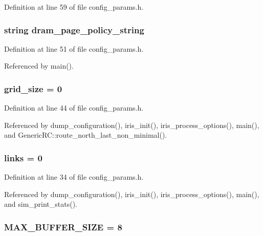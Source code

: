 Definition at line 59 of file config\_\-params.h.
\subsubsection[{dram\_\-page\_\-policy\_\-string}]{\setlength{\rightskip}{0pt plus 5cm}string {\bf dram\_\-page\_\-policy\_\-string}}\label{config__params_8h_11f6161a6a3e7db8577622882e0bd0a1}




Definition at line 51 of file config\_\-params.h.

Referenced by main().
\subsubsection[{grid\_\-size}]{ {\bf grid\_\-size} = 0}\label{config__params_8h_7cdd59c13b3ee2f719faf442120c1411}




Definition at line 44 of file config\_\-params.h.

Referenced by dump\_\-configuration(), iris\_\-init(), iris\_\-process\_\-options(), main(), and GenericRC::route\_\-north\_\-last\_\-non\_\-minimal().
\subsubsection[{links}]{ {\bf links} = 0}\label{config__params_8h_67ab92741d3553f20eba205ad4a0a196}




Definition at line 34 of file config\_\-params.h.

Referenced by dump\_\-configuration(), iris\_\-init(), iris\_\-process\_\-options(), main(), and sim\_\-print\_\-stats().
\subsubsection[{MAX\_\-BUFFER\_\-SIZE}]{ {\bf MAX\_\-BUFFER\_\-SIZE} = 8}\label{config__params_8h_5834e03c9871421dab2ce0050888d6f9}




